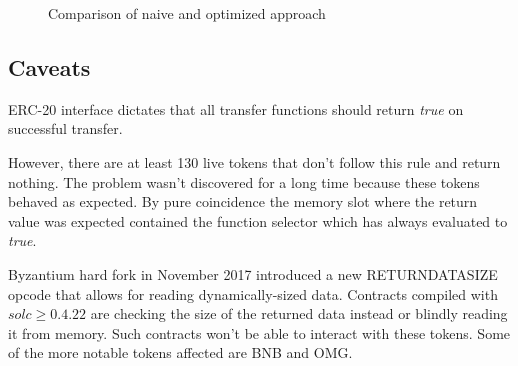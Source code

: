 \documentclass[12pt]{article}
\begin{document}
\begin{figure}[h]
\caption{Comparison of naive and optimized approach}
\end{figure}


\subsection{Caveats}

ERC-20 interface dictates that all transfer functions should return \textit{true} on successful transfer.

However, there are at least 130 live tokens that don't follow this rule and return nothing.
The problem wasn't discovered for a long time because these tokens behaved as expected\cite{cremer}.
By pure coincidence the memory slot where the return value was expected contained the function selector which has always evaluated to \textit{true}.

Byzantium hard fork in November 2017 introduced a new RETURNDATASIZE opcode that allows for reading dynamically-sized data.
Contracts compiled with $solc \geq 0.4.22$ are checking the size of the returned data instead or blindly reading it from memory.
Such contracts won't be able to interact with these tokens.
Some of the more notable tokens affected are BNB and OMG.
\end{document}
